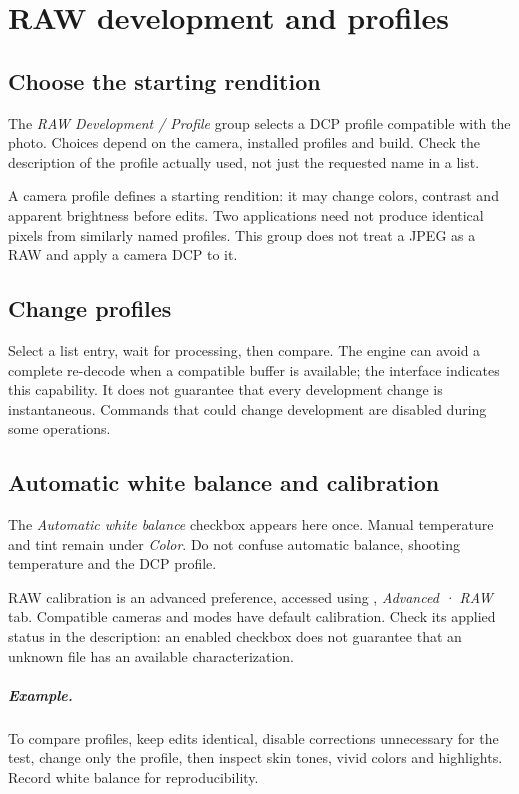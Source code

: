 \chapter{RAW development and profiles}
\section{Choose the starting rendition}
The \emph{RAW Development / Profile} group selects a DCP profile compatible
with the photo. Choices depend on the camera, installed profiles and build.
Check the description of the profile actually used, not just the requested
name in a list.

A camera profile defines a starting rendition: it may change colors, contrast
and apparent brightness before edits. Two applications need not produce
identical pixels from similarly named profiles. This group does not treat
a JPEG as a RAW and apply a camera DCP to it.

\section{Change profiles}
Select a list entry, wait for processing, then compare. The engine can avoid
a complete re-decode when a compatible buffer is available; the interface
indicates this capability. It does not guarantee that every development
change is instantaneous. Commands that could change development are disabled
during some operations.

\section{Automatic white balance and calibration}
The \emph{Automatic white balance} checkbox appears here once. Manual
temperature and tint remain under \emph{Color}. Do not confuse automatic
balance, shooting temperature and the DCP profile.

RAW calibration is an advanced preference, accessed using
, \emph{Advanced · RAW} tab. Compatible cameras and modes
have default calibration. Check its applied status in the description:
an enabled checkbox does not guarantee that an unknown file has an available
characterization.


\paragraph{Example.}
To compare profiles, keep edits identical, disable corrections unnecessary
for the test, change only the profile, then inspect skin tones, vivid colors
and highlights. Record white balance for reproducibility.
